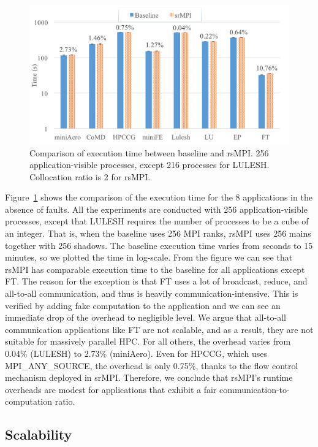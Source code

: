\begin{figure}[!t]
  \begin{center}
      \includegraphics[width=0.6\columnwidth]{Figures/runtime_overhead}
  \end{center}
  \caption{Comparison of execution time between baseline and rsMPI. 256 application-visible processes, except 216 processes for LULESH. Collocation ratio is 2 for rsMPI.}
  \label{fig:runtime_overhead}
\end{figure}

Figure~\ref{fig:runtime_overhead} shows the comparison of the execution time for the 8 applications in the absence of faults. All the experiments are conducted with 256 application-visible processes, except that LULESH requires the number of processes to be a cube of an integer. That is, when the baseline uses 256 MPI ranks, rsMPI uses 256 mains together with 256 shadows. The baseline execution time varies from seconds to 15 minutes, so we plotted the time in log-scale. 
From the figure we can see that rsMPI has comparable execution time to the baseline for all applications except FT. The reason for the exception is that FT uses a lot of broadcast, reduce, and all-to-all communication, and thus is heavily communication-intensive. This is verified by adding fake computation to the application and we can see an immediate drop of the overhead to negligible level. 
We argue that all-to-all communication applications like FT are not scalable, and as a result, they are not suitable for massively parallel HPC. 
For all others, the overhead varies from 0.04\% (LULESH) to 2.73\% (miniAero). Even for HPCCG, which uses MPI\_ANY\_SOURCE, the overhead is only 0.75\%, thanks to the flow control mechanism deployed in srMPI. 
Therefore, we conclude that rsMPI's runtime overheads are modest for applications that exhibit a fair communication-to-computation ratio.



\subsection{Scalability}

